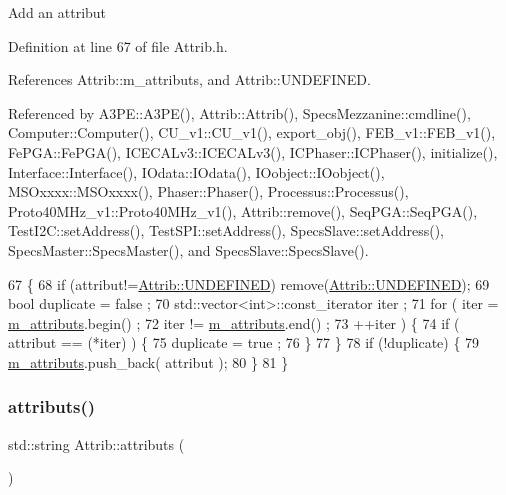 Add an attribut 

Definition at line 67 of file Attrib.\+h.



References Attrib\+::m\+\_\+attributs, and Attrib\+::\+U\+N\+D\+E\+F\+I\+N\+ED.



Referenced by A3\+P\+E\+::\+A3\+P\+E(), Attrib\+::\+Attrib(), Specs\+Mezzanine\+::cmdline(), Computer\+::\+Computer(), C\+U\+\_\+v1\+::\+C\+U\+\_\+v1(), export\+\_\+obj(), F\+E\+B\+\_\+v1\+::\+F\+E\+B\+\_\+v1(), Fe\+P\+G\+A\+::\+Fe\+P\+G\+A(), I\+C\+E\+C\+A\+Lv3\+::\+I\+C\+E\+C\+A\+Lv3(), I\+C\+Phaser\+::\+I\+C\+Phaser(), initialize(), Interface\+::\+Interface(), I\+Odata\+::\+I\+Odata(), I\+Oobject\+::\+I\+Oobject(), M\+S\+Oxxxx\+::\+M\+S\+Oxxxx(), Phaser\+::\+Phaser(), Processus\+::\+Processus(), Proto40\+M\+Hz\+\_\+v1\+::\+Proto40\+M\+Hz\+\_\+v1(), Attrib\+::remove(), Seq\+P\+G\+A\+::\+Seq\+P\+G\+A(), Test\+I2\+C\+::set\+Address(), Test\+S\+P\+I\+::set\+Address(), Specs\+Slave\+::set\+Address(), Specs\+Master\+::\+Specs\+Master(), and Specs\+Slave\+::\+Specs\+Slave().


\begin{DoxyCode}
67                             \{
68     \textcolor{keywordflow}{if} (attribut!=\hyperlink{classAttrib_a69e171d7cc6417835a5a306d3c764235a3a8da2ab97dda18aebab196fe4100531}{Attrib::UNDEFINED}) \textcolor{keyword}{remove}(\hyperlink{classAttrib_a69e171d7cc6417835a5a306d3c764235a3a8da2ab97dda18aebab196fe4100531}{Attrib::UNDEFINED});
69     \textcolor{keywordtype}{bool} duplicate = false ;
70     std::vector<int>::const\_iterator iter ;
71     \textcolor{keywordflow}{for} ( iter  = \hyperlink{classAttrib_ac4bd58a0cc6b38a3b711d609a3d3aacc}{m\_attributs}.begin() ;
72           iter != \hyperlink{classAttrib_ac4bd58a0cc6b38a3b711d609a3d3aacc}{m\_attributs}.end()   ;
73           ++iter ) \{
74       \textcolor{keywordflow}{if} ( attribut == (*iter) ) \{
75         duplicate = true ;
76       \}
77     \}
78     \textcolor{keywordflow}{if} (!duplicate) \{
79       \hyperlink{classAttrib_ac4bd58a0cc6b38a3b711d609a3d3aacc}{m\_attributs}.push\_back( attribut );
80     \}
81   \}
\end{DoxyCode}
\mbox{\label{classAttrib_aee7bbf16b144887f196e1341b24f8a26}} 
\subsubsection{\texorpdfstring{attributs()}{attributs()}}
{\footnotesize\ttfamily std\+::string Attrib\+::attributs (\begin{DoxyParamCaption}{ }\end{DoxyParamCaption})\hspace{0.3cm}{\ttfamily [inherited]}}

